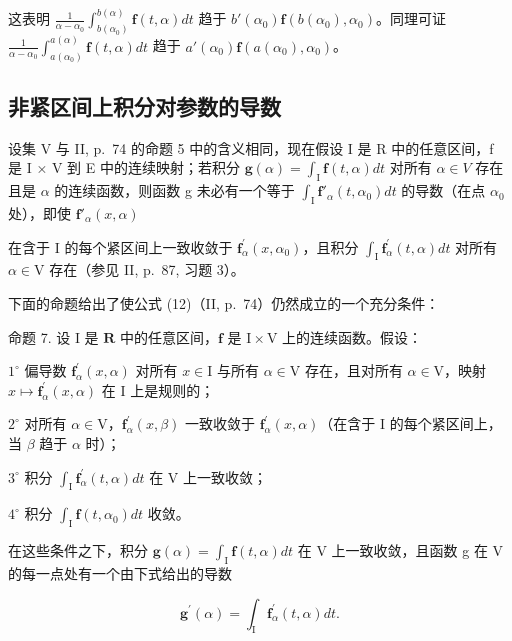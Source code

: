 这表明 \(\frac{1}{\alpha - \alpha_0} \int_{b(\alpha_0)}^{b(\alpha)} \mathbf{f}(t, \alpha) dt\) 趋于 \(b'(\alpha_0)\mathbf{f}(b(\alpha_0), \alpha_0)\)。同理可证 \(\frac{1}{\alpha - \alpha_0} \int_{a(\alpha_0)}^{a(\alpha)} \mathbf{f}(t, \alpha) dt\) 趋于 \(a'(\alpha_0)\mathbf{f}(a(\alpha_0), \alpha_0)\)。

\subsection{非紧区间上积分对参数的导数}

设集 V 与 II, p.~74 的命题 5 中的含义相同，现在假设 I 是 R 中的任意区间，f 是 I × V 到 E 中的连续映射；若积分 \(\mathbf{g}(\alpha) = \int_{\mathrm{I}} \mathbf{f}(t, \alpha) dt\) 对所有 \(\alpha \in V\) 存在且是 \(\alpha\) 的连续函数，则函数 g 未必有一个等于 \(\int_{\mathrm{I}} \mathbf{f}'_{\alpha}(t, \alpha_0) dt\) 的导数（在点 \(\alpha_0\) 处），即使 \(\mathbf{f}'_{\alpha}(x, \alpha)\)

在含于 I 的每个紧区间上一致收敛于 \(\mathbf{f}_{\alpha}^{\prime}(x,\alpha_{0})\)，且积分 \(\int_{\mathrm{I}}\mathbf{f}_{\alpha}^{\prime}(t,\alpha)dt\) 对所有 \(\alpha \in \mathrm{V}\) 存在（参见 II, p.~87, 习题 3）。

下面的命题给出了使公式 (12)（II, p.~74）仍然成立的一个充分条件：

命题 7. 设 I 是 \(\mathbf{R}\) 中的任意区间，\(\mathbf{f}\) 是 \(\mathrm{I} \times \mathrm{V}\) 上的连续函数。假设：

\(1^{\circ}\) 偏导数 \(\mathbf{f}_{\alpha}^{\prime}(x,\alpha)\) 对所有 \(x\in \mathrm{I}\) 与所有 \(\alpha \in \mathrm{V}\) 存在，且对所有 \(\alpha \in \mathrm{V}\)，映射 \(x\mapsto \mathbf{f}_{\alpha}^{\prime}(x,\alpha)\) 在 \(\mathrm{I}\) 上是规则的；

\(2^{\circ}\) 对所有 \(\alpha \in \mathrm{V}\)，\(\mathbf{f}_{\alpha}^{\prime}(x,\beta)\) 一致收敛于 \(\mathbf{f}_{\alpha}^{\prime}(x,\alpha)\)（在含于 I 的每个紧区间上，当 \(\beta\) 趋于 \(\alpha\) 时）；

\(3^{\circ}\) 积分 \(\int_{\mathrm{I}}\mathbf{f}_{\alpha}^{\prime}(t,\alpha)dt\) 在 \(\mathrm{V}\) 上一致收敛；

\(4^{\circ}\) 积分 \(\int_{\mathrm{I}}\mathbf{f}(t,\alpha_0)dt\) 收敛。

在这些条件之下，积分 \(\mathbf{g}(\alpha)=\int_{\mathrm{I}}\mathbf{f}(t,\alpha)dt\) 在 V 上一致收敛，且函数 g 在 V 的每一点处有一个由下式给出的导数

\[
\mathbf {g} ^ {\prime} (\alpha) = \int_ {\mathrm{I}} \mathbf {f} _ {\alpha} ^ {\prime} (t, \alpha) d t.\tag{14}
\]

